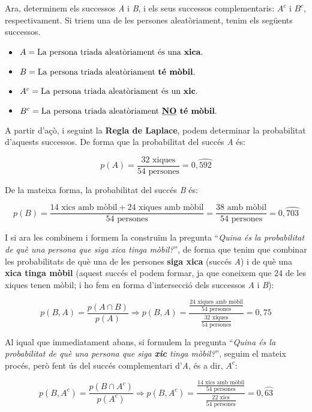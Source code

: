\documentclass[12pt,a4paper]{article}
\begin{document}
Ara, determinem els successos \textit{A} i \textit{B}, i els seus successos complementaris: \(A^c\) i \(B^c\), respectivament. Si triem una de les persones aleatòriament, tenim els següents successos.
\begin{itemize}
	\item \(A = \text{La persona triada aleatòriament és una \textbf{xica}.}\)
	\item \(B = \text{La persona triada aleatòriament \textbf{té mòbil}.}\)
	\item \(A^c = \text{La persona triada aleatòriament és un \textbf{xic}.}\)
	\item \(B^c = \text{La persona triada aleatòriament \textbf{\underline{NO} té mòbil}.}\)
\end{itemize}

A partir d'açò, i seguint la \textbf{Regla de Laplace}, podem determinar la probabilitat d'aquests successos. De forma que la probabilitat del succés \textit{A} és:

\[
	p(A) = \frac{32\text{ xiques}}{54\text{ persones}} = 0,\wideparen{592}
\]

De la mateixa forma, la probabilitat del succés \textit{B} és:

\[
	p(B) = \frac{14\text{ xics amb mòbil} + 24\text{ xiques amb mòbil}}{54\text{ persones}} = \frac{38\text{ amb mòbil}}{54\text{ persones}} = 0,\wideparen{703}
\]

I si ara les combinem i formem la construïm la pregunta ``\textit{Quina és la probabilitat de què una persona que siga xica tinga mòbil?}'', de forma que tenim que combinar les probabilitats de què una de les persones \textbf{siga xica} (succés \textit{A}) i de què una \textbf{xica tinga mòbil} (aquest succés el podem formar, ja que coneixem que 24 de les xiques tenen mòbil; i ho fem en forma d'intersecció dels successos \textit{A} i \textit{B}):

\[
	p(B,A) = \frac{p(A \cap B)}{p(A)} \Rightarrow p(B,A) = \frac{\frac{24\text{ xiques amb mòbil}}{54\text{ persones}}}{\frac{32\text{ xiques}}{54\text{ persones}}} = 0,75
\]

Al iqual que immediatament abans, si formulem la pregunta ``\textit{Quina és la probabilitat de què una persona que siga \textbf{xic} tinga mòbil?}'', seguim el mateix procés, però fent ús del succés complementari d'\textit{A}, és a dir, \(A^c\):

\[
	p(B,A^c) = \frac{p(B \cap A^c)}{p(A^c)} \Rightarrow p(B,A^c) = \frac{\frac{14\text{ xics amb mòbil}}{54\text{ persones}}}{\frac{22\text{ xics}}{54\text{ persones}}} = 0,\wideparen{63}
\]
\end{document}
